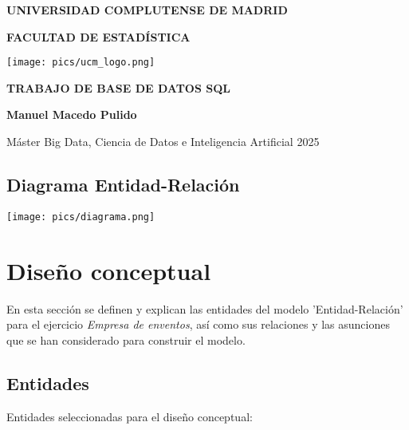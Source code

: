 \documentclass[12pt]{article}
\begin{document}
\begin{titlepage}
        \centering
        { \bfseries \Large UNIVERSIDAD COMPLUTENSE DE MADRID}
        \vspace{0.6cm} 

        {\bfseries  \Large FACULTAD DE ESTADÍSTICA} 
        \vspace{0.6cm}
        
        {\texttt{[image: pics/ucm\_logo.png]}} 
        \vspace{0.6cm}
        
        {\bfseries \Large TRABAJO DE BASE DE DATOS SQL}
        \vspace{1.75cm}
        
        {\bfseries \LARGE Manuel Macedo Pulido}
        \vspace{6mm} 

        {\large Máster Big Data, Ciencia de Datos e Inteligencia Artificial}
        {\large 2025 }
        \vspace{6mm}

        \thispagestyle{empty}
        
    \end{titlepage}

    \setcounter{page}{1}

    \newpage
    \tableofcontents

    \newpage
    \begin{landscape}
        \section{Diagrama Entidad-Relación}
        {\texttt{[image: pics/diagrama.png]}} 
    \end{landscape}

    \newpage
    \section{Diseño conceptual}
    En esta sección se definen y explican las entidades del modelo 'Entidad-Relación' para el ejercicio \textit{Empresa de enventos}, 
    así como sus relaciones y las asunciones que se han considerado para construir el modelo. 

    \subsection{Entidades}
    Entidades seleccionadas para el diseño conceptual:
\end{document}
